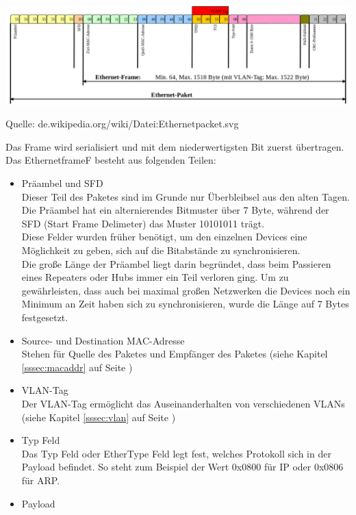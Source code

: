 \documentclass[12pt,a4paper]{report}
\begin{document}
\begin{onehalfspace}
\begin{center}
\includegraphics[scale=0.35]{../docs/tarkes/pics/Ethernetpaket.png}
\begin{scriptsize}
Quelle: de.wikipedia.org/wiki/Datei:Ethernetpacket.svg
\end{scriptsize}
\end{center}

Das Frame wird serialisiert und mit dem niederwertigsten Bit zuerst übertragen. Das EthernetframeF besteht aus folgenden Teilen:
\begin{itemize}
\item Präambel und SFD\\
Dieser Teil des Paketes sind im Grunde nur Überbleibsel aus den alten Tagen. Die Präambel hat ein alternierendes Bitmuster über 7 Byte, während der SFD (Start Frame Delimeter) das Muster 10101011 trägt.\\
Diese Felder wurden früher benötigt, um den einzelnen Devices eine Möglichkeit zu geben, sich auf die Bitabstände zu synchronisieren.\\
Die große Länge der Präambel liegt darin begründet, dass beim Passieren eines Repeaters oder Hubs immer ein Teil verloren ging. Um zu gewährleisten, dass auch bei maximal großen Netzwerken die Devices noch ein Minimum an Zeit haben sich zu synchronisieren, wurde die Länge auf 7 Bytes festgesetzt. 
\item Source- und Destination MAC-Adresse\\
Stehen für Quelle des Paketes und Empfänger des Paketes (siehe Kapitel \ref{sssec:macaddr} auf Seite \pageref{sssec:macaddr})
\item VLAN-Tag\\
Der VLAN-Tag ermöglicht das Auseinanderhalten von verschiedenen VLANs (siehe Kapitel \ref{sssec:vlan} auf Seite \pageref{sssec:vlan})
\item Typ Feld\\
Das Typ Feld oder EtherType Feld legt fest, welches Protokoll sich in der Payload befindet. So steht zum Beispiel der Wert 0x0800 für IP oder 0x0806 für ARP.
\item Payload\\

\end{itemize}
\end{onehalfspace}
\end{document}
